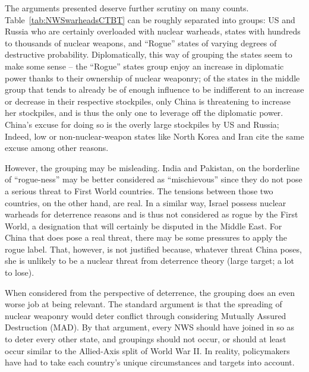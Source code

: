 \documentclass[twoside,titlepage,11pt,twocolumn,a4paper]{article}
\begin{document}
The arguments presented deserve further scrutiny on many
counts. Table~\ref{tab:NWSwarheadsCTBT} can be roughly separated into
groups: US and Russia who are certainly overloaded with nuclear
warheads, states with hundreds to thousands of nuclear weapons, and
``Rogue'' states of varying degrees of destructive
probability. Diplomatically, this way of grouping the states seem to
make some sense -- the ``Rogue'' states group enjoy an increase in
diplomatic power thanks to their ownership of nuclear weaponry; of the
states in the middle group that tends to already be of enough
influence to be indifferent to an increase or decrease in their
respective stockpiles, only China is threatening to increase her
stockpiles, and is thus the only one to leverage off the diplomatic
power. China's excuse for doing so is the overly large stockpiles by
US and Russia; Indeed, low or non-nuclear-weapon states like North
Korea and Iran cite the same excuse among other reasons. 

However, the grouping may be misleading. India and Pakistan, on the
borderline of ``rogue-ness'' may be better considered as
``mischievous'' since they do not pose a serious threat to First World
countries. The tensions between those two countries, on the other
hand, are real. In a similar way, Israel possess nuclear warheads for
deterrence reasons and is thus not considered as rogue by the First
World, a designation that will certainly be disputed in the Middle
East. For China that does pose a real threat, there may be some
pressures to apply the rogue label. That, however, is not justified
because, whatever threat China poses, she is unlikely to be a nuclear
threat from deterrence theory (large target; a lot to lose).

When considered from the perspective of deterrence, the grouping does
an even worse job at being relevant. The standard argument is that the
spreading of nuclear weaponry would deter conflict through considering
Mutually Assured Destruction (MAD). By that argument, every NWS should
have joined in so as to deter every other state, and groupings should
not occur, or should at least occur similar to the Allied-Axis split
of World War II. In reality, policymakers have had to take each
country's unique circumstances and targets into account. 
\end{document}
